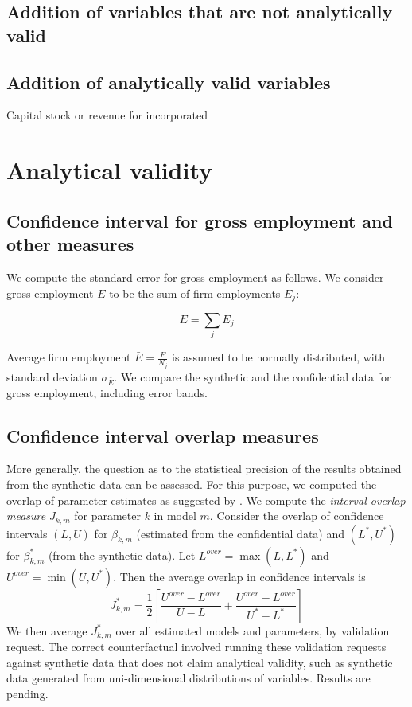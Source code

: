 \documentclass{article}
\begin{document}
\subsection{Addition of variables that are not analytically valid}

\subsection{Addition of analytically valid variables}

Capital stock or revenue for incorporated 

\newpage


\section{Analytical validity}

\subsection{Confidence interval for gross employment and other measures}
We compute the standard error for gross employment as follows. We consider gross employment $E$ to be the sum of firm employments $E_j$:

\begin{equation}
E = \sum_j E_j
\end{equation}

Average firm employment $\bar{E} = \frac{E}{N_j}$ is assumed to be normally distributed, with standard deviation $\sigma_{\bar{E}}$. We compare the synthetic and the confidential data for gross employment, including error bands.

\subsection{Confidence interval overlap measures}

More generally, the question as to the statistical precision of the results obtained from the synthetic data can be assessed. For this purpose, we computed the overlap of parameter estimates  as suggested by \cite{tas2006}. We compute the \emph{interval overlap measure} $J_{k,m}$ for parameter $k$ in model $m$. Consider the overlap of confidence intervals $(L,U)$ for $\beta_{k,m}$ (estimated from the confidential data) and $(L^{*},U^{*})$ for $\beta_{k,m}^*$ (from the synthetic data). Let $L^{over} = \max (L,L^{*} )$ and $U^{over} = \min (U,U^{*})$. Then the average overlap in confidence intervals is
$$
J_{k,m}^{*} = \frac{1}{2} \left [ \frac{U^{over} - L^{over}}{U-L} + \frac{U^{over} - L^{over}}{U^*-L ^*}        \right ]
$$
We then average $J_{k,m}^{*}$ over all estimated models and parameters, by validation request. The correct counterfactual involved running these validation requests against synthetic data that does not claim analytical validity, such as synthetic data generated from uni-dimensional distributions of variables. Results are pending.
\end{document}
